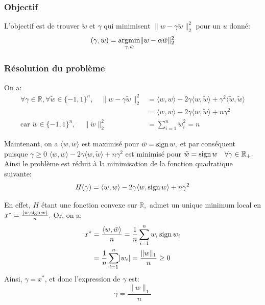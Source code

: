 \subsubsection{Objectif}
L'objectif est de trouver $\tilde{w}$ et $\gamma$ qui minimisent $\lVert w-\gamma \tilde{w}\rVert_2^2$ pour un $u$ donné:
\begin{equation}\label{XnorNet:VectorQuantification:Problem}
	(\gamma,w)=\operatorname*{\arg\!\min}_{\gamma,\tilde{w}}\lVert w-\alpha \tilde{w}\rVert_2^2
\end{equation} 
\subsubsection{Résolution du problème}
On a:
\begin{align*}
	\forall \gamma \in \mathbb{R},\forall \tilde w \in \{-1,1\}^n, \quad \lVert w - \gamma\tilde w \rVert_2^2 &= \langle w , w \rangle -2\gamma  \langle w , \tilde w\rangle + \gamma ^2\langle \tilde w , \tilde w \rangle   \\
	&=  \langle w , w \rangle -2\gamma \langle w , \tilde w\rangle + n\gamma ^2 \\
	\text{car }\tilde w \in\{-1,1\}^n,\quad \lVert \tilde w \rVert_2^2 &= \sum_{i=1}^n\tilde w_i^2 = n  
\end{align*}

Maintenant, on a $\langle w,\tilde w \rangle$ est maximisé pour $\tilde w=\operatorname{sign} w,$ et par conséquent puisque $\gamma \ge 0$
\newline $ \langle w , w \rangle -2\gamma \langle w , \tilde w\rangle + n\gamma ^2$ est minimisé pour $\tilde w=\operatorname{sign} w \quad \forall \gamma \in\mathbb{R}_+.$
\newline Ainsi le problème est réduit à la minimisation de la fonction quadratique suivante:
\begin{equation}
	H(\gamma)=\langle w , w \rangle -2\gamma \langle w , \operatorname{sign} w\rangle + n\gamma ^2
\end{equation}

En effet, $H$ étant une fonction convexe sur $\mathbb{R},$ admet un unique minimum local en $x^*=\frac{\langle w,\operatorname{sign} w\rangle}{n}.$
\newline Or, on a:
\begin{align*}
	x^*&=\frac{\langle w,\tilde w \rangle}{n}= \frac{1}{n}\sum_{i=1}^n w_i \operatorname{sign} w_i \\
	&= \frac{1}{n} \sum_{i=1}^n \lvert w_i\rvert = \frac{\lVert w \rVert_1}{n} \ge 0
\end{align*}
Ainsi, $\gamma = x^*$, et donc l'expression de $\gamma$ est:
\begin{equation}
	\gamma = \frac{\lVert w \rVert_1}{n}
\end{equation}


